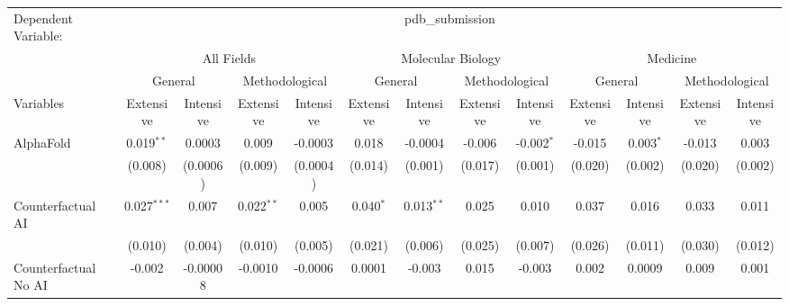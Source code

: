 \begingroup
\centering
\begin{tabular}{lcccccccccccc}
   \tabularnewline \midrule \midrule
   Dependent Variable: & \multicolumn{12}{c}{pdb\_submission}\\
 & \multicolumn{4}{c}{All Fields} & \multicolumn{4}{c}{Molecular Biology} & \multicolumn{4}{c}{Medicine} \\
\cmidrule(lr){2-5} \cmidrule(lr){6-9} \cmidrule(lr){10-13}
 & \multicolumn{2}{c}{General} & \multicolumn{2}{c}{Methodological} & \multicolumn{2}{c}{General} & \multicolumn{2}{c}{Methodological} & \multicolumn{2}{c}{General} & \multicolumn{2}{c}{Methodological} \\
\cmidrule(lr){2-3} \cmidrule(lr){4-5} \cmidrule(lr){6-7} \cmidrule(lr){8-9} \cmidrule(lr){10-11} \cmidrule(lr){12-13}
Variables & \multicolumn{1}{c}{Extensive} & \multicolumn{1}{c}{Intensive} & \multicolumn{1}{c}{Extensive} & \multicolumn{1}{c}{Intensive} & \multicolumn{1}{c}{Extensive} & \multicolumn{1}{c}{Intensive} & \multicolumn{1}{c}{Extensive} & \multicolumn{1}{c}{Intensive} & \multicolumn{1}{c}{Extensive} & \multicolumn{1}{c}{Intensive} & \multicolumn{1}{c}{Extensive} & \multicolumn{1}{c}{Intensive} \\
\cmidrule(lr){1-1}\cmidrule(lr){2-2} \cmidrule(lr){3-3} \cmidrule(lr){4-4} \cmidrule(lr){5-5} \cmidrule(lr){6-6} \cmidrule(lr){7-7} \cmidrule(lr){8-8} \cmidrule(lr){9-9} \cmidrule(lr){10-10} \cmidrule(lr){11-11} \cmidrule(lr){12-12} \cmidrule(lr){13-13}
   AlphaFold                                & 0.019$^{**}$  & 0.0003        & 0.009         & -0.0003   & 0.018        & -0.0004      & -0.006  & -0.002$^{*}$ & -0.015  & 0.003$^{*}$    & -0.013  & 0.003\\   
                                            & (0.008)       & (0.0006)      & (0.009)       & (0.0004)  & (0.014)      & (0.001)      & (0.017) & (0.001)      & (0.020) & (0.002)        & (0.020) & (0.002)\\   
   Counterfactual AI                        & 0.027$^{***}$ & 0.007         & 0.022$^{**}$  & 0.005     & 0.040$^{*}$  & 0.013$^{**}$ & 0.025   & 0.010        & 0.037   & 0.016          & 0.033   & 0.011\\   
                                            & (0.010)       & (0.004)       & (0.010)       & (0.005)   & (0.021)      & (0.006)      & (0.025) & (0.007)      & (0.026) & (0.011)        & (0.030) & (0.012)\\   
   Counterfactual No AI                     & -0.002        & -0.00008      & -0.0010       & -0.0006   & 0.0001       & -0.003       & 0.015   & -0.003       & 0.002   & 0.0009         & 0.009   & 0.001\\   

\end{tabular}
